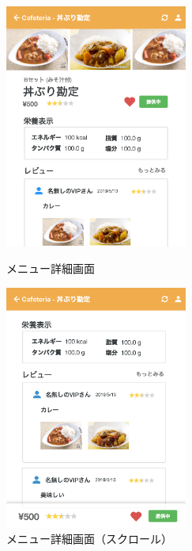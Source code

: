 \documentclass[a4paper]{ltjsarticle}
\begin{document}
    \begin{figure}[ht]
        \begin{minipage}[t]{.49\textwidth}
            \center
            \includegraphics[width=60mm]{ui/detail-head.png}
            \caption{メニュー詳細画面}
            \label{img:detail-head}
        \end{minipage}
        \begin{minipage}[t]{.49\textwidth}
            \center
            \includegraphics[width=60mm]{ui/detail-tail.png}
            \caption{メニュー詳細画面（スクロール）}
            \label{img:detail-tail}
        \end{minipage}
    \end{figure}
\end{document}
